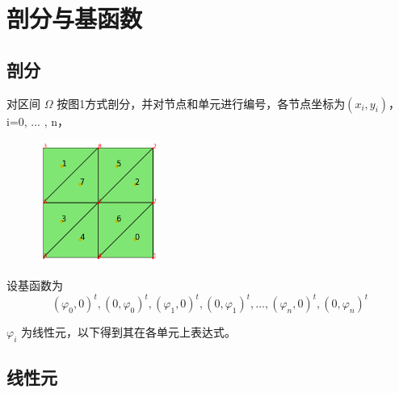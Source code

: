 \documentclass[UTF8,titlepage,twocolumn]{ctexart}
\begin{document}
	
%
%	
%	

\section{剖分与基函数}

\subsection{剖分}

对区间 $\Omega$ 按图1方式剖分，并对节点和单元进行编号，各节点坐标为$(x_i,y_i)$， i=0, ... , n，

\begin{figure}[hbt]
	\centering
	\includegraphics[height=4cm,width=4cm]{../image/subdivsion.png}
	\caption{}
\end{figure}

设基函数为 
$$ 
(\varphi_0,0)^t, (0,\varphi_0)^t, (\varphi_1,0)^t, (0,\varphi_1)^t, ... , (\varphi_n,0)^t, (0,\varphi_n)^t 
$$

$\varphi_i$ 为线性元，以下得到其在各单元上表达式。 

\subsection{线性元}
\end{document}
